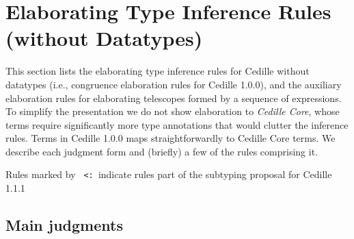 \documentclass{article}
\newcommand{\les}{\texttt{\,<:\,}}
\begin{document}

\section{Elaborating Type Inference Rules (without Datatypes)}
This section lists the elaborating type inference rules for Cedille without
datatypes (i.e., congruence elaboration rules for Cedille 1.0.0), and the
auxiliary elaboration rules for elaborating telescopes formed by a sequence of
expressions. To simplify the presentation we do not show elaboration to
\textit{Cedille Core}, whose terms require significantly more type annotations
that would clutter the inference rules. Terms in Cedille 1.0.0 maps
straightforwardly to Cedille Core terms. We describe each judgment form and
(briefly) a few of the rules comprising it.

Rules marked by \les indicate rules part of the subtyping proposal for Cedille 1.1.1

\subsection{Main judgments}
\end{document}
